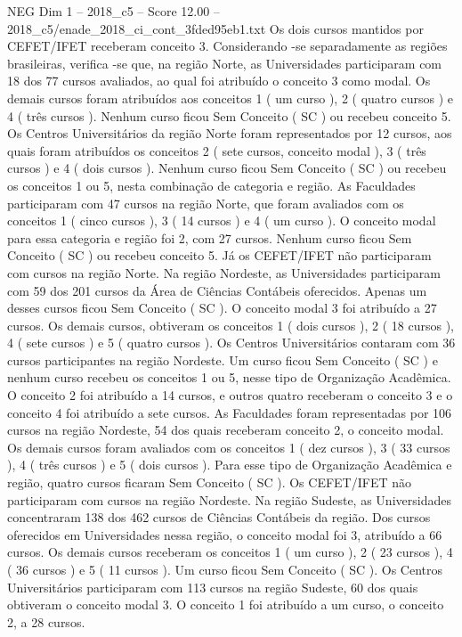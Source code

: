 \begin{textsample}{NEG Dim 1 – 2018\_c5 – Score 12.00 – 2018\_c5/enade\_2018\_ci\_cont\_3fded95eb1.txt}
Os dois cursos mantidos por CEFET/IFET receberam conceito 3.
Considerando -se separadamente as regiões brasileiras, verifica -se que, na região Norte, as Universidades participaram com 18 dos 77 cursos avaliados, ao qual foi atribuído o conceito 3 como modal.
Os demais cursos foram atribuídos aos conceitos 1 ( um curso ), 2 ( quatro cursos ) e 4 ( três cursos ).
Nenhum curso ficou Sem Conceito ( SC ) ou recebeu conceito 5.
Os Centros Universitários da região Norte foram representados por 12 cursos, aos quais foram atribuídos os conceitos 2 ( sete cursos, conceito modal ), 3 ( três cursos ) e 4 ( dois cursos ).
Nenhum curso ficou Sem Conceito ( SC ) ou recebeu os conceitos 1 ou 5, nesta combinação de categoria e região.
As Faculdades participaram com 47 cursos na região Norte, que foram avaliados com os conceitos 1 ( cinco cursos ), 3 ( 14 cursos ) e 4 ( um curso ).
O conceito modal para essa categoria e região foi 2, com 27 cursos.
Nenhum curso ficou Sem Conceito ( SC ) ou recebeu conceito 5.
Já os CEFET/IFET não participaram com cursos na região Norte.
Na região Nordeste, as Universidades participaram com 59 dos 201 cursos da Área de Ciências Contábeis oferecidos.
Apenas um desses cursos ficou Sem Conceito ( SC ).
O conceito modal 3 foi atribuído a 27 cursos.
Os demais cursos, obtiveram os conceitos 1 ( dois cursos ), 2 ( 18 cursos ), 4 ( sete cursos ) e 5 ( quatro cursos ).
Os Centros Universitários contaram com 36 cursos participantes na região Nordeste.
Um curso ficou Sem Conceito ( SC ) e nenhum curso recebeu os conceitos 1 ou 5, nesse tipo de Organização Acadêmica.
O conceito 2 foi atribuído a 14 cursos, e outros quatro receberam o conceito 3 e o conceito 4 foi atribuído a sete cursos.
As Faculdades foram representadas por 106 cursos na região Nordeste, 54 dos quais receberam conceito 2, o conceito modal.
Os demais cursos foram avaliados com os conceitos 1 ( dez cursos ), 3 ( 33 cursos ), 4 ( três cursos ) e 5 ( dois cursos ).
Para esse tipo de Organização Acadêmica e região, quatro cursos ficaram Sem Conceito ( SC ).
Os CEFET/IFET não participaram com cursos na região Nordeste.
Na região Sudeste, as Universidades concentraram 138 dos 462 cursos de Ciências Contábeis da região.
Dos cursos oferecidos em Universidades nessa região, o conceito modal foi 3, atribuído a 66 cursos.
Os demais cursos receberam os conceitos 1 ( um curso ), 2 ( 23 cursos ), 4 ( 36 cursos ) e 5 ( 11 cursos ).
Um curso ficou Sem Conceito ( SC ).
Os Centros Universitários participaram com 113 cursos na região Sudeste, 60 dos quais obtiveram o conceito modal 3.
O conceito 1 foi atribuído a um curso, o conceito 2, a 28 cursos.

\end{textsample}
